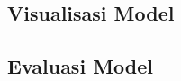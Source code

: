 \documentclass[ugmtesis]{ugmtesis}
\begin{document}
		\subsection{Visualisasi Model}
		\label{implementasi visualisasi model}
		


		\subsection{Evaluasi Model}
		\label{implementasi evaluasi model}
		






\end{document}
